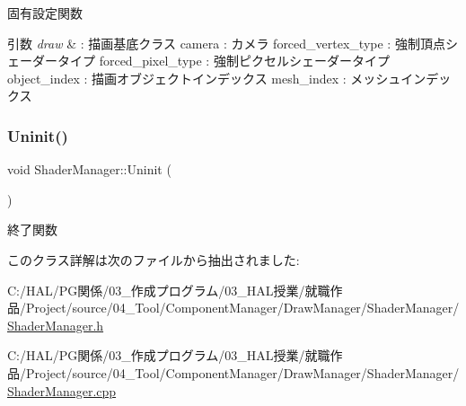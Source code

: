 固有設定関数 


\begin{DoxyParams}{引数}
{\em draw} & \+: 描画基底クラス camera \+: カメラ forced\+\_\+vertex\+\_\+type \+: 強制頂点シェーダータイプ forced\+\_\+pixel\+\_\+type \+: 強制ピクセルシェーダータイプ object\+\_\+index \+: 描画オブジェクトインデックス mesh\+\_\+index \+: メッシュインデックス \\
\hline
\end{DoxyParams}
\mbox{\label{class_shader_manager_afc31a6bbe86e6b57edd7be0972f48ab1}} 
\subsubsection{\texorpdfstring{Uninit()}{Uninit()}}
{\footnotesize\ttfamily void Shader\+Manager\+::\+Uninit (\begin{DoxyParamCaption}{ }\end{DoxyParamCaption})}



終了関数 



このクラス詳解は次のファイルから抽出されました\+:\begin{DoxyCompactItemize}
\item 
C\+:/\+H\+A\+L/\+P\+G関係/03\+\_\+作成プログラム/03\+\_\+\+H\+A\+L授業/就職作品/\+Project/source/04\+\_\+\+Tool/\+Component\+Manager/\+Draw\+Manager/\+Shader\+Manager/\mbox{\hyperlink{_shader_manager_8h}{Shader\+Manager.\+h}}\item 
C\+:/\+H\+A\+L/\+P\+G関係/03\+\_\+作成プログラム/03\+\_\+\+H\+A\+L授業/就職作品/\+Project/source/04\+\_\+\+Tool/\+Component\+Manager/\+Draw\+Manager/\+Shader\+Manager/\mbox{\hyperlink{_shader_manager_8cpp}{Shader\+Manager.\+cpp}}\end{DoxyCompactItemize}
